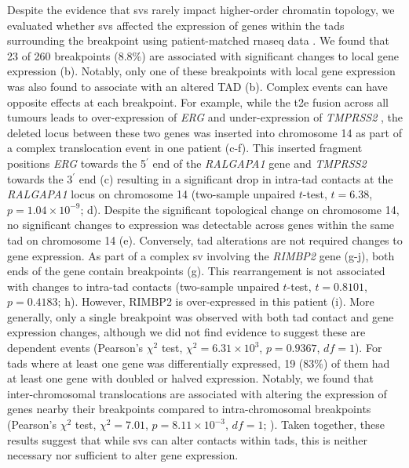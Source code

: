 Despite the evidence that \glspl{sv} rarely impact higher-order chromatin topology, we evaluated whether \glspl{sv} affected the expression of genes within the \glspl{tad} surrounding the breakpoint using patient-matched \gls{rnaseq} data \cite{chenWidespreadFunctionalRNA2019}.
We found that 23 of 260 breakpoints (8.8\%) are associated with significant changes to local gene expression (b).
Notably, only one of these breakpoints with local gene expression was also found to associate with an altered TAD (b).
Complex events can have opposite effects at each breakpoint.
For example, while the \gls{t2e} fusion across all tumours leads to over-expression of \emph{ERG} and under-expression of \emph{TMPRSS2} \cite{fraserGenomicHallmarksLocalized2017,kronTMPRSS2ERGFusion2017}, the deleted locus between these two genes was inserted into chromosome 14 as part of a complex translocation event in one patient (c-f).
This inserted fragment positions \emph{ERG} towards the 5$^\prime$ end of the \emph{RALGAPA1} gene and \emph{TMPRSS2} towards the 3$^\prime$ end (c) resulting in a significant drop in intra-\gls{tad} contacts at the \emph{RALGAPA1} locus on chromosome 14 (two-sample unpaired $t$-test, $t = 6.38$, $p = 1.04 \times 10^{-9}$; d).
Despite the significant topological change on chromosome 14, no significant changes to expression was detectable across genes within the same \gls{tad} on chromosome 14 (e).
Conversely, \gls{tad} alterations are not required changes to gene expression.
As part of a complex \gls{sv} involving the \emph{RIMBP2} gene (g-j), both ends of the gene contain breakpoints (g).
This rearrangement is not associated with changes to intra-\gls{tad} contacts (two-sample unpaired $t$-test, $t = 0.8101$, $p = 0.4183$; h).
However, RIMBP2 is over-expressed in this patient (i).
More generally, only a single breakpoint was observed with both \gls{tad} contact and gene expression changes, although we did not find evidence to suggest these are dependent events (Pearson's $\chi^2$ test, $\chi^2 = 6.31 \times 10^3$, $p = 0.9367$, $df = 1$).
For \glspl{tad} where at least one gene was differentially expressed, 19 (83\%) of them had at least one gene with doubled or halved expression.
Notably, we found that inter-chromosomal translocations are associated with altering the expression of genes nearby their breakpoints compared to intra-chromosomal breakpoints (Pearson's $\chi^2$ test, $\chi^2 = 7.01$, $p = 8.11 \times 10^{-3}$, $df = 1$; ).
Taken together, these results suggest that while \glspl{sv} can alter contacts within \glspl{tad}, this is neither necessary nor sufficient to alter gene expression.


